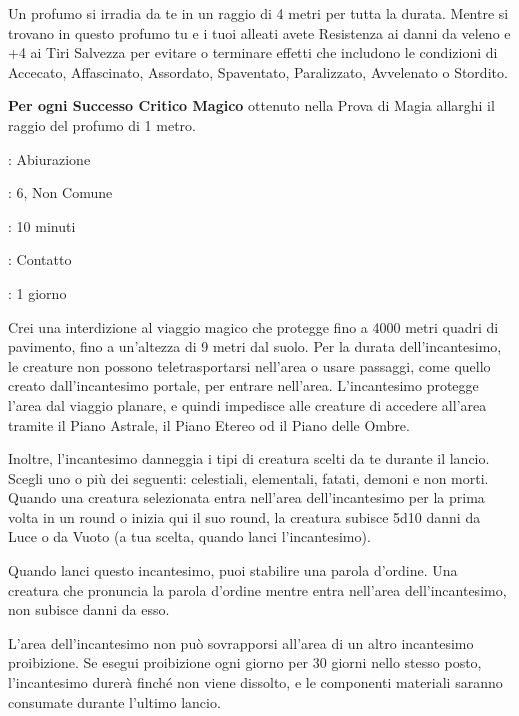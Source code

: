 \begin{multicols}{2}
Un profumo si irradia da te in un raggio di 4 metri per tutta la durata. Mentre si trovano in questo profumo tu e i tuoi alleati avete Resistenza ai danni da veleno e +4 ai Tiri Salvezza per evitare o terminare effetti che includono le condizioni di Accecato, Affascinato, Assordato, Spaventato, Paralizzato, Avvelenato o Stordito.

\textbf{Per ogni Successo Critico Magico} ottenuto nella Prova di Magia allarghi il raggio del profumo di 1 metro.

\noindent\colorbox{OBSSgold!10}{
\begin{minipage}{0.95\linewidth}
\begin{description}[noitemsep, topsep=0pt, parsep=0pt, partopsep=0pt, leftmargin=0cm, labelwidth=1.3cm]
	\item[\textbf{Lista}]: Abiurazione
	\item[\textbf{Livello}]: 6, Non Comune
	\item[\textbf{Lancio}]: 10 minuti
	\item[\textbf{Gittata}]: Contatto
	\item[\textbf{Durata}]: 1 giorno
\end{description}
\end{minipage}}\smallskip

Crei una interdizione al viaggio magico che protegge fino a 4000 metri quadri di pavimento, fino a un'altezza di 9 metri dal suolo. Per la durata dell'incantesimo, le creature non possono teletrasportarsi nell'area o usare passaggi, come quello creato dall'incantesimo portale, per entrare nell'area. L'incantesimo protegge l'area dal viaggio planare, e quindi impedisce alle creature di accedere all'area tramite il Piano Astrale, il Piano Etereo od il Piano delle Ombre.

Inoltre, l'incantesimo danneggia i tipi di creatura scelti da te durante il lancio. Scegli uno o più dei seguenti: celestiali, elementali, fatati, demoni e non morti. Quando una creatura selezionata entra nell'area dell'incantesimo per la prima volta in un round o inizia qui il suo round, la creatura subisce 5d10 danni da Luce o da Vuoto (a tua scelta, quando lanci l'incantesimo).

Quando lanci questo incantesimo, puoi stabilire una parola d'ordine. Una creatura che pronuncia la parola d'ordine mentre entra nell'area dell'incantesimo, non subisce danni da esso.

L'area dell'incantesimo non può sovrapporsi all'area di un altro incantesimo proibizione. Se esegui proibizione ogni giorno per 30 giorni nello stesso posto, l'incantesimo durerà finché non viene dissolto, e le componenti materiali saranno consumate durante l'ultimo lancio.


\end{multicols}
